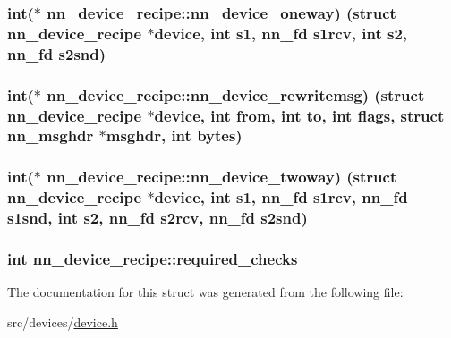 \subsubsection[{nn\+\_\+device\+\_\+oneway}]{\setlength{\rightskip}{0pt plus 5cm}int($\ast$ nn\+\_\+device\+\_\+recipe\+::nn\+\_\+device\+\_\+oneway) (struct {\bf nn\+\_\+device\+\_\+recipe} $\ast$device, int s1, {\bf nn\+\_\+fd} s1rcv, int s2, {\bf nn\+\_\+fd} s2snd)}\hypertarget{structnn__device__recipe_a2228a6409b18679d8ae17d5c230967cc}{}\label{structnn__device__recipe_a2228a6409b18679d8ae17d5c230967cc}
\subsubsection[{nn\+\_\+device\+\_\+rewritemsg}]{\setlength{\rightskip}{0pt plus 5cm}int($\ast$ nn\+\_\+device\+\_\+recipe\+::nn\+\_\+device\+\_\+rewritemsg) (struct {\bf nn\+\_\+device\+\_\+recipe} $\ast$device, int from, int to, int flags, struct {\bf nn\+\_\+msghdr} $\ast$msghdr, int bytes)}\hypertarget{structnn__device__recipe_afcfda6f162ed7dd5bb98f3d796a3a6ea}{}\label{structnn__device__recipe_afcfda6f162ed7dd5bb98f3d796a3a6ea}
\subsubsection[{nn\+\_\+device\+\_\+twoway}]{\setlength{\rightskip}{0pt plus 5cm}int($\ast$ nn\+\_\+device\+\_\+recipe\+::nn\+\_\+device\+\_\+twoway) (struct {\bf nn\+\_\+device\+\_\+recipe} $\ast$device, int s1, {\bf nn\+\_\+fd} s1rcv, {\bf nn\+\_\+fd} s1snd, int s2, {\bf nn\+\_\+fd} s2rcv, {\bf nn\+\_\+fd} s2snd)}\hypertarget{structnn__device__recipe_aff9065238d098af6a963756174a4043d}{}\label{structnn__device__recipe_aff9065238d098af6a963756174a4043d}
\subsubsection[{required\+\_\+checks}]{\setlength{\rightskip}{0pt plus 5cm}int nn\+\_\+device\+\_\+recipe\+::required\+\_\+checks}\hypertarget{structnn__device__recipe_a78ce62e7ab6b45a11e8dfeb5894b356e}{}\label{structnn__device__recipe_a78ce62e7ab6b45a11e8dfeb5894b356e}


The documentation for this struct was generated from the following file\+:\begin{DoxyCompactItemize}
\item 
src/devices/\hyperlink{device_8h}{device.\+h}\end{DoxyCompactItemize}
